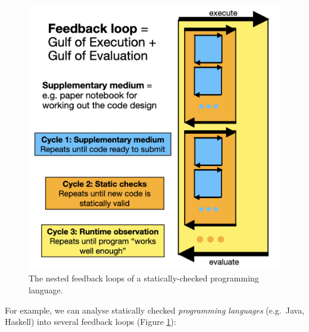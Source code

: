 \documentclass[ twoside,openright,titlepage,numbers=noenddot,headinclude,footinclude,cleardoublepage=empty,abstract=on,
                BCOR=5mm,paper=a4,fontsize=11pt
                ]{scrreprt}
\theoremstyle{definition}
\begin{document}
\begin{figure}
  \centering
  \includegraphics[width=0.5\linewidth]{feedback-loops.png}
  \caption[Feedback Loops in a statically-checked language]{The nested feedback loops of a statically-checked programming language.\label{fig:feedback-loops}}
\end{figure}

For example, we can analyse statically checked \emph{programming
languages} (e.g.~Java, Haskell) into several feedback loops (Figure
\ref{fig:feedback-loops}):
\end{document}
